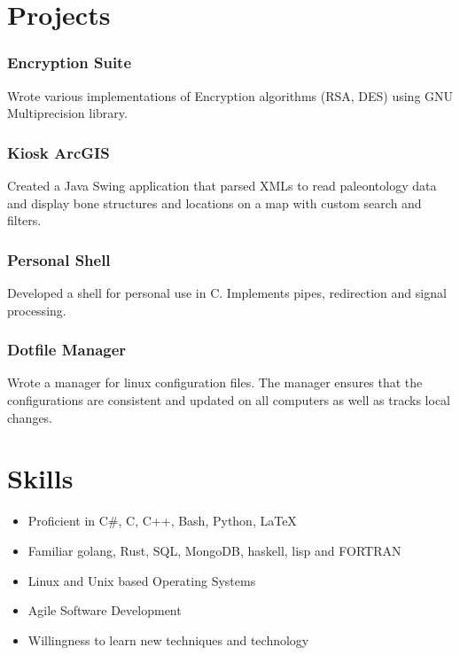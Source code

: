 \documentclass[11pt]{article}
\begin{document}
\section{P{\color{gray}rojects}}

\subsubsection{Encryption Suite}
Wrote various implementations of Encryption algorithms (RSA, DES) using GNU Multiprecision library.

\subsubsection{Kiosk ArcGIS}
 Created a Java Swing application that parsed XMLs to read paleontology data and display bone structures and 
 locations on a map with custom search and filters.

\subsubsection{Personal Shell}
Developed a shell for personal use in C. Implements pipes, redirection and signal processing.

\subsubsection{Dotfile Manager}
Wrote a manager for linux configuration files.
The manager ensures that the configurations are consistent and updated on all computers as well as tracks local changes.

\section{S{\color{gray}kills}}

\begin{multicols}{2}
	\begin{itemize}
	\item Proficient in C\#, C, C++, Bash, Python, \LaTeX
	\item Familiar golang, Rust, SQL, MongoDB, haskell, lisp and FORTRAN
	\item Linux and Unix based Operating Systems
	\item Agile Software Development
	\item Willingness to learn new techniques and technology
\end{itemize}
\end{multicols}
\end{document}
